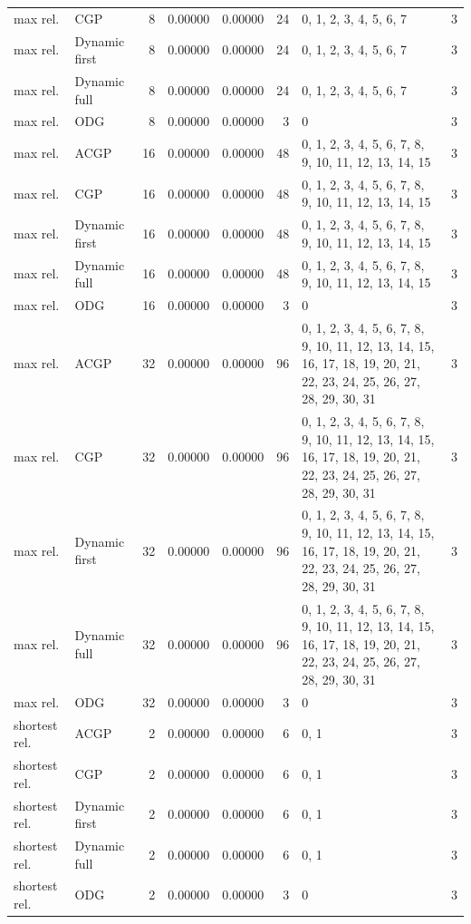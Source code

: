 \documentclass[10pt,a4paper]{article}
\begin{document}
\begin{longtable}{@{}p{23mm}p{29mm}rrrrp{36mm}r@{}}
max rel. & CGP & 8 & 0.00000 & 0.00000 & 24 & 0, 1, 2, 3, 4, 5, 6, 7 & 3 \\
max rel. & Dynamic first & 8 & 0.00000 & 0.00000 & 24 & 0, 1, 2, 3, 4, 5, 6, 7 & 3 \\
max rel. & Dynamic full & 8 & 0.00000 & 0.00000 & 24 & 0, 1, 2, 3, 4, 5, 6, 7 & 3 \\
max rel. & ODG & 8 & 0.00000 & 0.00000 & 3 & 0 & 3 \\
max rel. & ACGP & 16 & 0.00000 & 0.00000 & 48 & 0, 1, 2, 3, 4, 5, 6, 7, 8, 9, 10, 11, 12, 13, 14, 15 & 3 \\
max rel. & CGP & 16 & 0.00000 & 0.00000 & 48 & 0, 1, 2, 3, 4, 5, 6, 7, 8, 9, 10, 11, 12, 13, 14, 15 & 3 \\
max rel. & Dynamic first & 16 & 0.00000 & 0.00000 & 48 & 0, 1, 2, 3, 4, 5, 6, 7, 8, 9, 10, 11, 12, 13, 14, 15 & 3 \\
max rel. & Dynamic full & 16 & 0.00000 & 0.00000 & 48 & 0, 1, 2, 3, 4, 5, 6, 7, 8, 9, 10, 11, 12, 13, 14, 15 & 3 \\
max rel. & ODG & 16 & 0.00000 & 0.00000 & 3 & 0 & 3 \\
max rel. & ACGP & 32 & 0.00000 & 0.00000 & 96 & 0, 1, 2, 3, 4, 5, 6, 7, 8, 9, 10, 11, 12, 13, 14, 15, 16, 17, 18, 19, 20, 21, 22, 23, 24, 25, 26, 27, 28, 29, 30, 31 & 3 \\
max rel. & CGP & 32 & 0.00000 & 0.00000 & 96 & 0, 1, 2, 3, 4, 5, 6, 7, 8, 9, 10, 11, 12, 13, 14, 15, 16, 17, 18, 19, 20, 21, 22, 23, 24, 25, 26, 27, 28, 29, 30, 31 & 3 \\
max rel. & Dynamic first & 32 & 0.00000 & 0.00000 & 96 & 0, 1, 2, 3, 4, 5, 6, 7, 8, 9, 10, 11, 12, 13, 14, 15, 16, 17, 18, 19, 20, 21, 22, 23, 24, 25, 26, 27, 28, 29, 30, 31 & 3 \\
max rel. & Dynamic full & 32 & 0.00000 & 0.00000 & 96 & 0, 1, 2, 3, 4, 5, 6, 7, 8, 9, 10, 11, 12, 13, 14, 15, 16, 17, 18, 19, 20, 21, 22, 23, 24, 25, 26, 27, 28, 29, 30, 31 & 3 \\
max rel. & ODG & 32 & 0.00000 & 0.00000 & 3 & 0 & 3 \\
shortest rel. & ACGP & 2 & 0.00000 & 0.00000 & 6 & 0, 1 & 3 \\
shortest rel. & CGP & 2 & 0.00000 & 0.00000 & 6 & 0, 1 & 3 \\
shortest rel. & Dynamic first & 2 & 0.00000 & 0.00000 & 6 & 0, 1 & 3 \\
shortest rel. & Dynamic full & 2 & 0.00000 & 0.00000 & 6 & 0, 1 & 3 \\
shortest rel. & ODG & 2 & 0.00000 & 0.00000 & 3 & 0 & 3 \\

\end{longtable}
\end{document}
